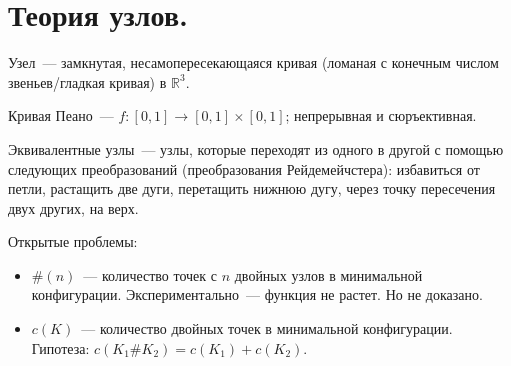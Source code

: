 \documentclass[12pt]{article}
\begin{document}
	\section{Теория узлов.}
	\begin{definition}
		Узел~--- замкнутая, несамопересекающаяся кривая (ломаная с конечным числом звеньев/гладкая кривая) в $\mathbb{R}^3$.
	\end{definition}
	\begin{definition}
		Кривая Пеано~--- $f: [0, 1] \rightarrow [0, 1] \times [0, 1]$; непрерывная и сюръективная.
	\end{definition}
	\begin{definition}
		Эквивалентные узлы~--- узлы, которые переходят из одного в другой с помощью следующих преобразований (преобразования Рейдемейчстера): избавиться от петли, растащить две дуги, перетащить нижнюю дугу, через точку пересечения двух других, на верх.
	\end{definition}
	\begin{note}
		Открытые проблемы:
		\begin{itemize}
			\item $\# (n)$~--- количество точек с $n$ двойных узлов в минимальной конфигурации. Экспериментально~--- функция не растет. Но не доказано.
			\item $c(K)$~--- количество двойных точек в минимальной конфигурации. Гипотеза: $c(K_1 \# K_2) = c(K_1) + c(K_2)$.
		\end{itemize}
	\end{note}
\end{document}

